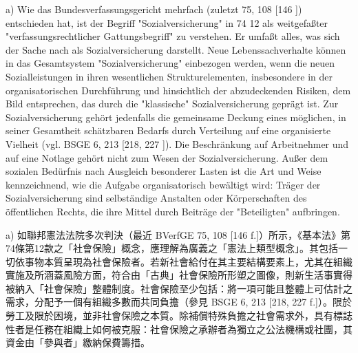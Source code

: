\documentclass[12pt]{article}
\begin{document}
\begin{sourcepara}[title={原文E.197}]
a) Wie das Bundesverfassungsgericht mehrfach (zuletzt \abbrBVerfGE{} 75, 108 [146 \abbrF{}]) entschieden hat, ist der Begriff "Sozialversicherung" in \abbrArt{} 74 \abbrNr{} 12 \abbrGG{}\ggfnArtSeventyFourTwelveDE{} als weitgefaßter "verfassungsrechtlicher Gattungsbegriff" zu verstehen. Er umfaßt alles, was sich der Sache nach als Sozialversicherung darstellt. Neue Lebenssachverhalte können in das Gesamtsystem "Sozialversicherung" einbezogen werden, wenn die neuen Sozialleistungen in ihren wesentlichen Strukturelementen, insbesondere in der organisatorischen Durchführung und hinsichtlich der abzudeckenden Risiken, dem Bild entsprechen, das durch die "klassische" Sozialversicherung geprägt ist. Zur Sozialversicherung gehört jedenfalls die gemeinsame Deckung eines möglichen, in seiner Gesamtheit schätzbaren Bedarfs durch Verteilung auf eine organisierte Vielheit (vgl. BSGE 6, 213 [218, 227 \abbrF{}]). Die Beschränkung auf Arbeitnehmer und auf eine Notlage gehört nicht zum Wesen der Sozialversicherung. Außer dem sozialen Bedürfnis nach Ausgleich besonderer Lasten ist die Art und Weise kennzeichnend, wie die Aufgabe organisatorisch bewältigt wird: Träger der Sozialversicherung sind selbständige Anstalten oder Körperschaften des öffentlichen Rechts, die ihre Mittel durch Beiträge der "Beteiligten" aufbringen.
\end{sourcepara}
\begin{transpara}
a) 如聯邦憲法法院多次判決（最近 BVerfGE 75, 108 [146 f.]）所示，《基本法》第74條第12款\ggfnArtSeventyFourTwelveZH{}之「社會保險」概念，應理解為廣義之「憲法上類型概念」。其包括一切依事物本質呈現為社會保險者。若新社會給付在其主要結構要素上，尤其在組織實施及所涵蓋風險方面，符合由「古典」社會保險所形塑之圖像，則新生活事實得被納入「社會保險」整體制度。社會保險至少包括：將一項可能且整體上可估計之需求，分配予一個有組織多數而共同負擔（參見 BSGE 6, 213 [218, 227 f.]）。限於勞工及限於困境，並非社會保險之本質。除補償特殊負擔之社會需求外，具有標誌性者是任務在組織上如何被克服：社會保險之承辦者為獨立之公法機構或社團，其資金由「參與者」繳納保費籌措。
\end{transpara}
\end{document}
